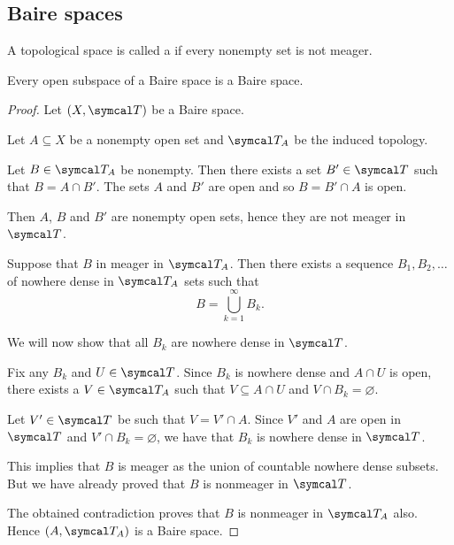 \subsection{Baire spaces}\label{subsec:baire_spaces}

\begin{definition}\label{def:baire_space}
  A topological space is called a  if every nonempty set is not meager.
\end{definition}

\begin{proposition}\label{thm:open_subspace_of_baire_space_is_baire}
  Every open subspace of a Baire space is a Baire space.
\end{proposition}
\begin{proof}
  Let \( (X, \Cal{T}) \) be a Baire space.

  Let \( A \subseteq X \) be a nonempty open set and \( \Cal{T}_A \) be the induced topology.

  Let \( B \in \Cal{T}_A \) be nonempty. Then there exists a set \( B' \in \Cal{T} \) such that \( B = A \cap B' \). The sets \( A \) and \( B' \) are open and so \( B = B' \cap A \) is open.

  Then \( A \), \( B \) and \( B' \) are nonempty open sets, hence they are not meager in \( \Cal{T} \).

  Suppose that \( B \) in meager in \( \Cal{T}_A \). Then there exists a sequence \( B_1, B_2, \ldots \) of nowhere dense in \( \Cal{T}_A \) sets such that
  \begin{equation*}
    B = \bigcup_{k=1}^\infty B_k.
  \end{equation*}

  We will now show that all \( B_k \) are nowhere dense in \( \Cal{T} \).

  Fix any \( B_k \) and \( U \in \Cal{T} \). Since \( B_k \) is nowhere dense and \( A \cap U \) is open, there exists a \( V \in \Cal{T}_A \) such that \( V \subseteq A \cap U \) and \( V \cap B_k = \varnothing \).

  Let \( V' \in \Cal{T} \) be such that \( V = V' \cap A \). Since \( V' \) and \( A \) are open in \( \Cal{T} \) and \( V' \cap B_k = \varnothing \), we have that \( B_k \) is nowhere dense in \( \Cal{T} \).

  This implies that \( B \) is meager as the union of countable nowhere dense subsets. But we have already proved that \( B \) is nonmeager in \( \Cal{T} \).

  The obtained contradiction proves that \( B \) is nonmeager in \( \Cal{T}_A \) also. Hence \( (A, \Cal{T}_A) \) is a Baire space.
\end{proof}
